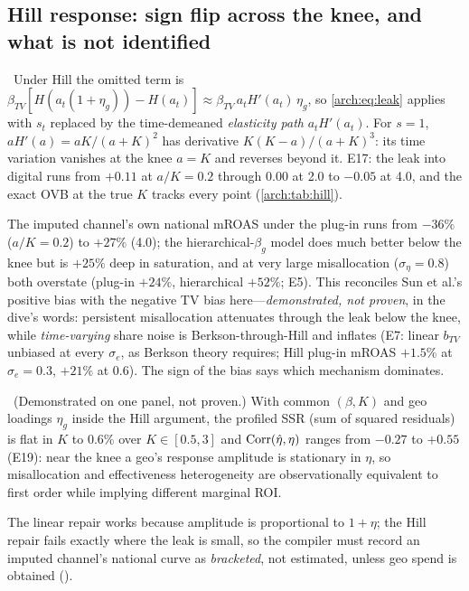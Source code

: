 \subsection{Hill response: sign flip across the knee, and what is not identified}

\begin{proposition}
\label{arch:prop:hill}
\tagNumerical\ Under Hill the omitted term is $\beta_{TV}[H(a_t(1+\eta_g)) - H(a_t)] \approx \beta_{TV}\,a_tH'(a_t)\,\eta_g$, so \cref{arch:eq:leak} applies with $s_t$ replaced by the time-demeaned \emph{elasticity path} $a_tH'(a_t)$. For $s = 1$, $aH'(a) = aK/(a+K)^2$ has derivative $K(K-a)/(a+K)^3$: its time variation vanishes at the knee $a = K$ and reverses beyond it. E17: the leak into digital runs from $+0.11$ at $a/K = 0.2$ through $0.00$ at 2.0 to $-0.05$ at 4.0, and the exact OVB at the true $K$ tracks every point (\cref{arch:tab:hill}).
\end{proposition}

The imputed channel's own national mROAS under the plug-in runs from $-36\%$ ($a/K = 0.2$) to $+27\%$ (4.0); the hierarchical-$\beta_g$ model does much better below the knee but is $+25\%$ deep in saturation, and at very large misallocation ($\sigma_\eta = 0.8$) both overstate (plug-in $+24\%$, hierarchical $+52\%$; E5). This reconciles Sun et al.'s positive bias with the negative TV bias here---\emph{demonstrated, not proven}, in the dive's words: persistent misallocation attenuates through the leak below the knee, while \emph{time-varying} share noise is Berkson-through-Hill and inflates (E7: linear $b_{TV}$ unbiased at every $\sigma_e$, as Berkson theory requires; Hill plug-in mROAS $+1.5\%$ at $\sigma_e = 0.3$, $+21\%$ at 0.6). The sign of the bias says which mechanism dominates.

\begin{proposition}
\label{arch:prop:nonident}
\tagNumerical\ (Demonstrated on one panel, not proven.) With common $(\beta,K)$ and geo loadings $\eta_g$ inside the Hill argument, the profiled SSR (sum of squared residuals) is flat in $K$ to 0.6\% over $K \in [0.5,3]$ and $\operatorname{Corr}(\hat\eta,\eta)$ ranges from $-0.27$ to $+0.55$ (E19): near the knee a geo's response amplitude is stationary in $\eta$, so misallocation and effectiveness heterogeneity are observationally equivalent to first order while implying different marginal ROI.
\end{proposition}

The linear repair works because amplitude is proportional to $1+\eta$; the Hill repair fails exactly where the leak is small, so the compiler must record an imputed channel's national curve as \emph{bracketed}, not estimated, unless geo spend is obtained ().

